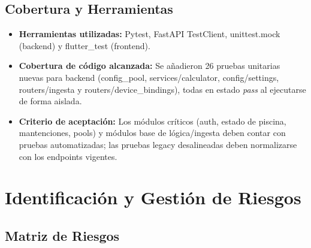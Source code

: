 \documentclass[11pt, a4paper]{article}
\begin{document}
\subsection{Cobertura y Herramientas}

\begin{itemize}
  \item \textbf{Herramientas utilizadas:} Pytest, FastAPI TestClient, unittest.mock (backend) y flutter\_test (frontend).
  \item \textbf{Cobertura de código alcanzada:} Se añadieron 26 pruebas unitarias nuevas para backend (config\_pool, services/calculator, config/settings, routers/ingesta y routers/device\_bindings), todas en estado \textit{pass} al ejecutarse de forma aislada.
  \item \textbf{Criterio de aceptación:} Los módulos críticos (auth, estado de piscina, mantenciones, pools) y módulos base de lógica/ingesta deben contar con pruebas automatizadas; las pruebas legacy desalineadas deben normalizarse con los endpoints vigentes.
\end{itemize}

\section{Identificación y Gestión de Riesgos}

\subsection{Matriz de Riesgos}
\end{document}

